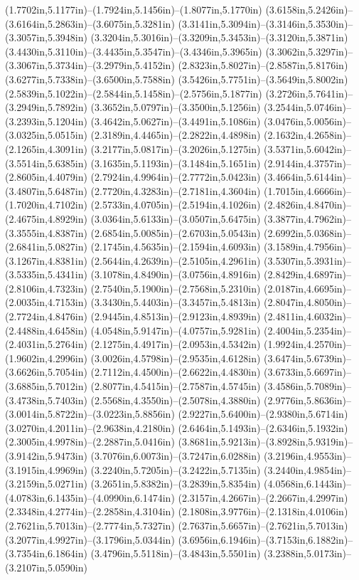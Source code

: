(1.7702in,5.1177in)--(1.7924in,5.1456in)--(1.8077in,5.1770in) (3.6158in,5.2426in)--(3.6164in,5.2863in)--(3.6075in,5.3281in) (3.3141in,5.3094in)--(3.3146in,5.3530in)--(3.3057in,5.3948in) (3.3204in,5.3016in)--(3.3209in,5.3453in)--(3.3120in,5.3871in) (3.4430in,5.3110in)--(3.4435in,5.3547in)--(3.4346in,5.3965in) (3.3062in,5.3297in)--(3.3067in,5.3734in)--(3.2979in,5.4152in) (2.8323in,5.8027in)--(2.8587in,5.8176in) (3.6277in,5.7338in)--(3.6500in,5.7588in) (3.5426in,5.7751in)--(3.5649in,5.8002in) (2.5839in,5.1022in)--(2.5844in,5.1458in)--(2.5756in,5.1877in) (3.2726in,5.7641in)--(3.2949in,5.7892in) (3.3652in,5.0797in)--(3.3500in,5.1256in) (3.2544in,5.0746in)--(3.2393in,5.1204in) (3.4642in,5.0627in)--(3.4491in,5.1086in) (3.0476in,5.0056in)--(3.0325in,5.0515in) (2.3189in,4.4465in)--(2.2822in,4.4898in) (2.1632in,4.2658in)--(2.1265in,4.3091in) (3.2177in,5.0817in)--(3.2026in,5.1275in) (3.5371in,5.6042in)--(3.5514in,5.6385in) (3.1635in,5.1193in)--(3.1484in,5.1651in) (2.9144in,4.3757in)--(2.8605in,4.4079in) (2.7924in,4.9964in)--(2.7772in,5.0423in) (3.4664in,5.6144in)--(3.4807in,5.6487in) (2.7720in,4.3283in)--(2.7181in,4.3604in) (1.7015in,4.6666in)--(1.7020in,4.7102in) (2.5733in,4.0705in)--(2.5194in,4.1026in) (2.4826in,4.8470in)--(2.4675in,4.8929in) (3.0364in,5.6133in)--(3.0507in,5.6475in) (3.3877in,4.7962in)--(3.3555in,4.8387in) (2.6854in,5.0085in)--(2.6703in,5.0543in) (2.6992in,5.0368in)--(2.6841in,5.0827in) (2.1745in,4.5635in)--(2.1594in,4.6093in) (3.1589in,4.7956in)--(3.1267in,4.8381in) (2.5644in,4.2639in)--(2.5105in,4.2961in) (3.5307in,5.3931in)--(3.5335in,5.4341in) (3.1078in,4.8490in)--(3.0756in,4.8916in) (2.8429in,4.6897in)--(2.8106in,4.7323in) (2.7540in,5.1900in)--(2.7568in,5.2310in) (2.0187in,4.6695in)--(2.0035in,4.7153in) (3.3430in,5.4403in)--(3.3457in,5.4813in) (2.8047in,4.8050in)--(2.7724in,4.8476in) (2.9445in,4.8513in)--(2.9123in,4.8939in) (2.4811in,4.6032in)--(2.4488in,4.6458in) (4.0548in,5.9147in)--(4.0757in,5.9281in) (2.4004in,5.2354in)--(2.4031in,5.2764in) (2.1275in,4.4917in)--(2.0953in,4.5342in) (1.9924in,4.2570in)--(1.9602in,4.2996in) (3.0026in,4.5798in)--(2.9535in,4.6128in) (3.6474in,5.6739in)--(3.6626in,5.7054in) (2.7112in,4.4500in)--(2.6622in,4.4830in) (3.6733in,5.6697in)--(3.6885in,5.7012in) (2.8077in,4.5415in)--(2.7587in,4.5745in) (3.4586in,5.7089in)--(3.4738in,5.7403in) (2.5568in,4.3550in)--(2.5078in,4.3880in) (2.9776in,5.8636in)--(3.0014in,5.8722in)--(3.0223in,5.8856in) (2.9227in,5.6400in)--(2.9380in,5.6714in) (3.0270in,4.2011in)--(2.9638in,4.2180in) (2.6464in,5.1493in)--(2.6346in,5.1932in) (2.3005in,4.9978in)--(2.2887in,5.0416in) (3.8681in,5.9213in)--(3.8928in,5.9319in)--(3.9142in,5.9473in) (3.7076in,6.0073in)--(3.7247in,6.0288in) (3.2196in,4.9553in)--(3.1915in,4.9969in) (3.2240in,5.7205in)--(3.2422in,5.7135in) (3.2440in,4.9854in)--(3.2159in,5.0271in) (3.2651in,5.8382in)--(3.2839in,5.8354in) (4.0568in,6.1443in)--(4.0783in,6.1435in)--(4.0990in,6.1474in) (2.3157in,4.2667in)--(2.2667in,4.2997in) (2.3348in,4.2774in)--(2.2858in,4.3104in) (2.1808in,3.9776in)--(2.1318in,4.0106in) (2.7621in,5.7013in)--(2.7774in,5.7327in) (2.7637in,5.6657in)--(2.7621in,5.7013in) (3.2077in,4.9927in)--(3.1796in,5.0344in) (3.6956in,6.1946in)--(3.7153in,6.1882in)--(3.7354in,6.1864in) (3.4796in,5.5118in)--(3.4843in,5.5501in) (3.2388in,5.0173in)--(3.2107in,5.0590in) 